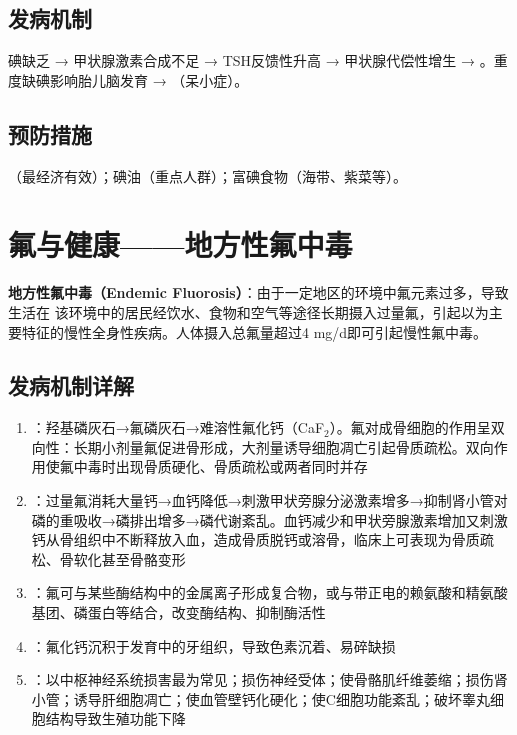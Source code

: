 \documentclass[10pt,a4paper,oneside]{ctexbook}
\begin{document}
\subsection{发病机制}

碘缺乏 → 甲状腺激素合成不足 → TSH反馈性升高 → 甲状腺代偿性增生 → 。重度缺碘影响胎儿脑发育 → （呆小症）。

\subsection{预防措施}

（最经济有效）；碘油（重点人群）；富碘食物（海带、紫菜等）。

\section{氟与健康——地方性氟中毒}

\begin{defbox}
\textbf{地方性氟中毒（Endemic Fluorosis）}：由于一定地区的环境中氟元素过多，导致生活在 该环境中的居民经饮水、食物和空气等途径长期摄入过量氟，引起以为主要特征的慢性全身性疾病。人体摄入总氟量超过4 mg/d即可引起慢性氟中毒。
\end{defbox}

\subsection{发病机制详解}

\begin{enumerate}[leftmargin=*]
    \item {}：羟基磷灰石→氟磷灰石→难溶性氟化钙（CaF$_2$）。氟对成骨细胞的作用呈双向性：长期小剂量氟促进骨形成，大剂量诱导细胞凋亡引起骨质疏松。双向作用使氟中毒时出现骨质硬化、骨质疏松或两者同时并存
    \item {}：过量氟消耗大量钙→血钙降低→刺激甲状旁腺分泌激素增多→抑制肾小管对磷的重吸收→磷排出增多→磷代谢紊乱。血钙减少和甲状旁腺激素增加又刺激钙从骨组织中不断释放入血，造成骨质脱钙或溶骨，临床上可表现为骨质疏松、骨软化甚至骨骼变形
    \item {}：氟可与某些酶结构中的金属离子形成复合物，或与带正电的赖氨酸和精氨酸基团、磷蛋白等结合，改变酶结构、抑制酶活性
    \item {}：氟化钙沉积于发育中的牙组织，导致色素沉着、易碎缺损
    \item {}：以中枢神经系统损害最为常见；损伤神经受体；使骨骼肌纤维萎缩；损伤肾小管；诱导肝细胞凋亡；使血管壁钙化硬化；使C细胞功能紊乱；破坏睾丸细胞结构导致生殖功能下降
\end{enumerate}
\end{document}

